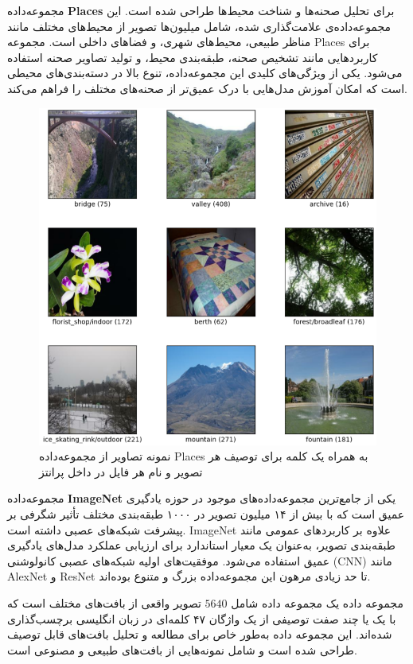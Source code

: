 مجموعه‌داده \textbf{Places} برای تحلیل صحنه‌ها و شناخت محیط‌ها طراحی شده است. این مجموعه‌داده‌ی علامت‌گذاری شده، شامل میلیون‌ها تصویر از محیط‌های مختلف مانند مناظر طبیعی، محیط‌های شهری، و فضاهای داخلی است. مجموعه Places برای کاربردهایی مانند تشخیص صحنه، طبقه‌بندی محیط، و تولید تصاویر صحنه استفاده می‌شود. یکی از ویژگی‌های کلیدی این مجموعه‌داده، تنوع بالا در دسته‌بندی‌های محیطی است که امکان آموزش مدل‌هایی با درک عمیق‌تر از صحنه‌های مختلف را فراهم می‌کند.

\begin{figure}
	\centering
	\includegraphics[width=0.7\linewidth]{places1}
	\caption{نمونه تصاویر از مجموعه‌داده Places به همراه یک کلمه برای توصیف هر تصویر و نام هر فایل در داخل پرانتز}
	\label{fig:places1}
\end{figure}


مجموعه‌داده \textbf{ImageNet} یکی از جامع‌ترین مجموعه‌داده‌های موجود در حوزه یادگیری عمیق است که با بیش از ۱۴ میلیون تصویر در ۱۰۰۰ طبقه‌بندی مختلف تأثیر شگرفی بر پیشرفت شبکه‌های عصبی داشته است. ImageNet علاوه بر کاربردهای عمومی مانند طبقه‌بندی تصویر، به‌عنوان یک معیار استاندارد برای ارزیابی عملکرد مدل‌های یادگیری عمیق استفاده می‌شود. موفقیت‌های اولیه شبکه‌های عصبی کانولوشنی (CNN) مانند AlexNet و ResNet تا حد زیادی مرهون این مجموعه‌داده بزرگ و متنوع بوده‌اند.



مجموعه داده
یک مجموعه داده شامل $5640$ تصویر واقعی از بافت‌های مختلف است که با یک یا چند صفت توصیفی از یک واژگان ۴۷ کلمه‌ای در زبان انگلیسی برچسب‌گذاری شده‌اند. این مجموعه داده به‌طور خاص برای مطالعه و تحلیل بافت‌های قابل توصیف طراحی شده است و شامل نمونه‌هایی از بافت‌های طبیعی و مصنوعی است. 

